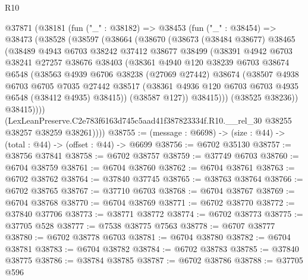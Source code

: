 \begin{lexlean}{R10}
\begin{coremodule}
  @37871
    (@38181
      (fun ("_" : @38182) =>
      @38453
        (fun ("_" : @38454) =>
        @38473
          (@38528
            (@38597
              (@38664
                (@38670
                  (@38673
                    (@38484 @38677)
                    @38465
                    (@38489
                      @4943
                      @6703
                      @38242
                      @37412
                      @38677
                      @38499
                      (@38391
                        @4942
                        @6703
                        @38241
                        @27257
                        @38676
                        @38403
                        (@38361
                          @4940
                          @120
                          @38239
                          @6703
                          @38674
                          @6548
                          (@38563
                            @4939
                            @6706
                            @38238
                            (@27069 @27442)
                            @38674
                            (@38507
                              @4938
                              @6703
                              @6705
                              @7035
                              @27442
                              @38517
                              (@38361 @4936 @120 @6703 @6703 @4935 @6548 (@38412 @4935) @38415))
                            (@38587 @127))
                          @38415)))
                    (@38525 @38236))
                  @38415))))
          (LexLeanPreserve.C2e783f6163d745c5aad41f387823334f.R10.__rel_30
            @38255
            @38257
            @38259
            @38261))))
@38755 := (message : @6698) -> (size : @44) -> (total : @44) -> (offset : @44) -> @6699
@38756 := @6702 @35130
@38757 := @38756 @37841
@38758 := @6702 @38757
@38759 := @37749 @6703
@38760 := @6704 @38759
@38761 := @6704 @38760
@38762 := @6704 @38761
@38763 := @6702 @38762
@38764 := @37840 @37745
@38765 := @38763 @38764
@38766 := @6702 @38765
@38767 := @37710 @6703
@38768 := @6704 @38767
@38769 := @6704 @38768
@38770 := @6704 @38769
@38771 := @6702 @38770
@38772 := @37840 @37706
@38773 := @38771 @38772
@38774 := @6702 @38773
@38775 := @37705 @528
@38777 := @7538 @38775 @7563
@38778 := @6707 @38777
@38780 := @6702 @38778 @6703
@38781 := @6704 @38780
@38782 := @6704 @38781
@38783 := @6704 @38782
@38784 := @6702 @38783
@38785 := @37840 @38775
@38786 := @38784 @38785
@38787 := @6702 @38786
@38788 := @37705 @596

\end{coremodule}
\end{lexlean}
